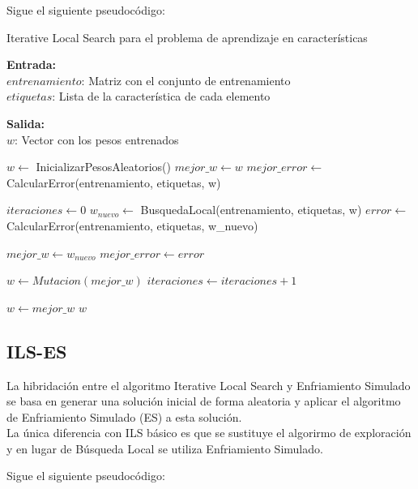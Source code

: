 \documentclass[12pt, spanish]{article}
\begin{document}
Sigue el siguiente pseudocódigo: 

\begin{algorithm}[h]
  \caption{Iterative Local Search para el problema de aprendizaje en características}
  \label{algorithm:ILS}

  \textbf{Entrada:}\\
  $entrenamiento$: Matriz con el conjunto de entrenamiento\\
  $etiquetas$: Lista de la característica de cada elemento

  \textbf{Salida:}\\
  $w$: Vector con los pesos entrenados

  \begin{algorithmic}[1]
    \STATE $w \gets$ InicializarPesosAleatorios()
    \STATE $mejor\_w \gets w$
    \STATE $mejor\_error \gets$ CalcularError(entrenamiento, etiquetas, w)

    \STATE $iteraciones \gets 0$
      \STATE $w_{nuevo} \gets$ BusquedaLocal(entrenamiento, etiquetas, w)
      \STATE $error \gets$ CalcularError(entrenamiento, etiquetas, w_{nuevo})

        \STATE $mejor\_w \gets w_{nuevo}$
        \STATE $mejor\_error \gets error$
      \ENDIF

      \STATE $w \gets Mutacion(mejor\_w)$
      \STATE $iteraciones \gets iteraciones + 1$
    \ENDWHILE

    \STATE $w \gets mejor\_w$
    \RETURN $w$

  \end{algorithmic}
\end{algorithm}


\pagebreak
\subsection{ILS-ES}
La hibridación entre el algoritmo Iterative Local Search y Enfriamiento Simulado se basa en generar una solución inicial de forma aleatoria y aplicar el algoritmo de Enfriamiento Simulado (ES) a esta solución. \\
\newline
La única diferencia con ILS básico es que se sustituye el algorirmo de exploración y en lugar de Búsqueda Local se utiliza Enfriamiento Simulado. 

Sigue el siguiente pseudocódigo: 
\end{document}

